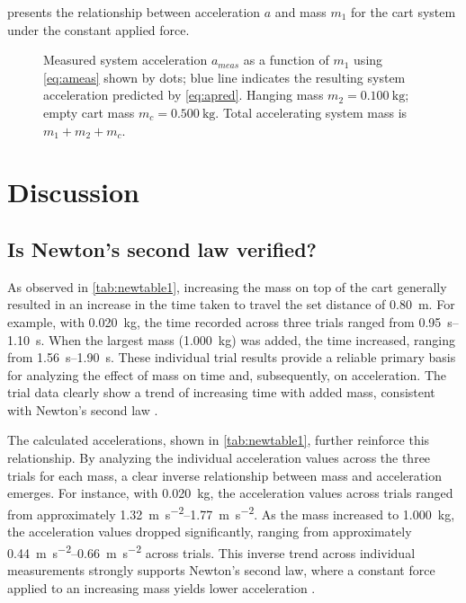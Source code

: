 ﻿\documentclass[reprint,amsmath,amssymb,prl]{revtex4-2}
\begin{document}
 presents the relationship between acceleration $a$ and mass $m_1$ for the cart system under the constant applied force. 
\begin{figure}
\begin{center}

\end{center}
\caption{\label{fig:5} Measured system acceleration $a_{meas}$ as a function of $m_1$ using \cref{eq:ameas} shown by dots; blue line indicates the resulting system acceleration predicted by \cref{eq:apred}. Hanging mass $m_2=\qty{0.100}{\kilo\gram}$; empty cart mass $m_c=\qty{0.500}{\kilo\gram}$. Total accelerating system mass is $m_1+m_2+m_c$.}
\end{figure}








\section{Discussion}

\subsection{Is Newton’s second law verified?}
As observed in \cref{tab:newtable1}, increasing the mass on top of the cart generally resulted in an increase in the time taken to travel the set distance of \qty{0.80}{\meter}. For example, with \qty{0.020}{\kilo\gram}, the time recorded across three trials ranged from \qtyrange{0.95}{1.10}{\second}. When the largest mass (\qty{1.000}{\kilo\gram}) was added, the time increased, ranging from \qtyrange{1.56}{1.90}{\second}. These individual trial results provide a reliable primary basis for analyzing the effect of mass on time and, subsequently, on acceleration. The trial data clearly show a trend of increasing time with added mass, consistent with Newton’s second law \cite{knight2017physics}.

The calculated accelerations, shown in \cref{tab:newtable1}, further reinforce this relationship. By analyzing the individual acceleration values across the three trials for each mass, a clear inverse relationship between mass and acceleration emerges. For instance, with \qty{0.020}{\kilo\gram}, the acceleration values across trials ranged from approximately \qtyrange{1.32}{1.77}{\meter\per\second\squared}. As the mass increased to \qty{1.000}{\kilo\gram}, the acceleration values dropped significantly, ranging from approximately \qtyrange{0.44}{0.66}{\meter\per\second\squared} across trials. This inverse trend across individual measurements strongly supports Newton’s second law, where a constant force applied to an increasing mass yields lower acceleration \cite{knight2017physics}. 
\end{document}
